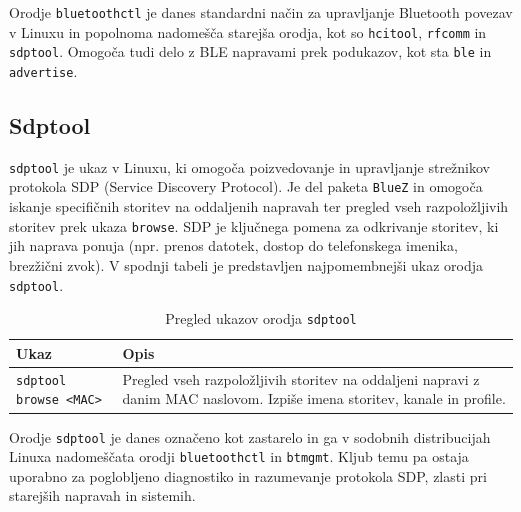 \documentclass[11pt,a4paper,slovene]{article}
\begin{document}
Orodje \texttt{bluetoothctl} je danes standardni način za upravljanje Bluetooth povezav v Linuxu in popolnoma nadomešča starejša orodja, kot so \texttt{hcitool}, \texttt{rfcomm} in \texttt{sdptool}. Omogoča tudi delo z BLE napravami prek podukazov, kot sta \texttt{ble} in \texttt{advertise}.

\subsection{Sdptool}

\texttt{sdptool} je ukaz v Linuxu, ki omogoča poizvedovanje in upravljanje strežnikov protokola SDP (Service Discovery Protocol). Je del paketa \texttt{BlueZ} in omogoča iskanje specifičnih storitev na oddaljenih napravah ter pregled vseh razpoložljivih storitev prek ukaza \texttt{browse}. SDP je ključnega pomena za odkrivanje storitev, ki jih naprava ponuja (npr. prenos datotek, dostop do telefonskega imenika, brezžični zvok). V spodnji tabeli je predstavljen najpomembnejši ukaz orodja \texttt{sdptool}.

\begin{table}[h]
	\centering
	\small
	\renewcommand{\arraystretch}{1.2}
	\begin{tabularx}{\linewidth}{|l|X|}
		\hline
		\textbf{Ukaz} & \textbf{Opis} \\
		\hline
		\texttt{sdptool browse <MAC>} & Pregled vseh razpoložljivih storitev na oddaljeni napravi z danim MAC naslovom. Izpiše imena storitev, kanale in profile. \\
		\hline
	\end{tabularx}
	\caption{Pregled ukazov orodja \texttt{sdptool}}
	\label{tab:sdptool}
\end{table}

Orodje \texttt{sdptool} je danes označeno kot zastarelo in ga v sodobnih distribucijah Linuxa nadomeščata orodji \texttt{bluetoothctl} in \texttt{btmgmt}. Kljub temu pa ostaja uporabno za poglobljeno diagnostiko in razumevanje protokola SDP, zlasti pri starejših napravah in sistemih.
\end{document}
